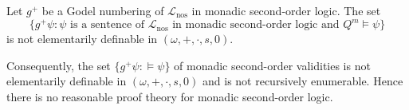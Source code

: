 Let $g^+$ be a Godel numbering of $\mathcal{L}_{\text{nos}}$ in monadic second-order logic. The set
$$\{g^+ \psi : \psi \text{ is a sentence of } \mathcal{L}_{\text{nos}} \text{ in monadic second-order logic and } Q^m \models \psi\}$$
is not elementarily definable in $(\omega, +, \cdot, s, 0)$.

Consequently, the set $\{g^+ \psi : \models \psi\}$ of monadic second-order validities is not elementarily definable in $(\omega, +, \cdot, s, 0)$ and is not recursively enumerable. Hence there is no reasonable proof theory for monadic second-order logic.
